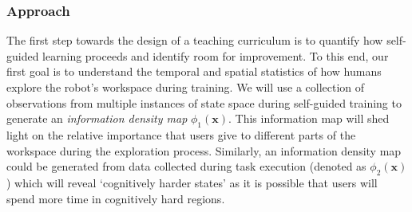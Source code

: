 \documentclass[12pt]{article}
\begin{document}
%	
%
%
%
%
%
%
\subsubsection{Approach}
The first step towards the design of a teaching curriculum is to quantify how self-guided learning proceeds and identify room for improvement. To this end, our first goal is to understand the temporal and spatial statistics of how humans explore the robot's workspace during training. We will use a collection of observations from multiple instances of state space during self-guided training to generate an \textit{information density map} $\phi_{1}(\boldsymbol{x})$. This information map will shed light on the relative importance that users give to different parts of the workspace during the exploration process. Similarly, an information density map could be generated from data collected during task execution (denoted as $\phi_{2}(\boldsymbol{x})$) which will reveal `cognitively harder states' as it is possible that users will spend more time in cognitively hard regions. 
\end{document}
